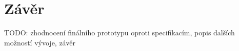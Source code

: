\chapter*{Závěr}
\label{ch:zaver}
TODO: zhodnocení finálního prototypu oproti specifikacím, popis dalších možností vývoje, závěr
